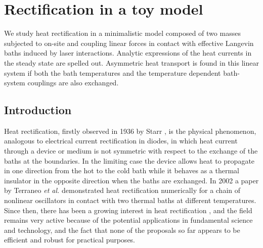 
\chapter{Rectification in a toy model}
\label{ChapterToyModel}
%
We study heat rectification in a minimalistic model composed of two masses subjected to on-site and coupling
linear forces in contact with effective Langevin baths induced by laser interactions.  Analytic expressions of the heat currents in the steady state are spelled out.  Asymmetric heat transport is found in this linear system if both the bath temperatures and the temperature dependent bath-system couplings
are also exchanged.
%
\newpage
%
\section{Introduction \label{sec:Introduction}}
%
Heat rectification, firstly observed in 1936 by Starr \cite{Starr1936}, is the physical phenomenon, analogous to electrical current rectification in diodes, in which heat current through a device or medium is not symmetric with respect to the exchange of the baths at the boundaries. In the limiting case the device allows heat to propagate in one direction from the hot to the cold bath while it behaves as a thermal insulator in the opposite direction when the baths are exchanged.  In 2002 a paper by Terraneo \textit{et al.} \cite{Terraneo2002} demonstrated heat rectification numerically for a chain of nonlinear oscillators in contact with two thermal baths at different temperatures. Since then, there has been a growing interest in heat rectification  \cite{Pereira2019,Roberts2011,Li2012,Ye2017,Wang2008,Wang2007,Casati2006,Joulain2016,Chang2006,Kobayashi2009,Leitner2013,Elzouka2017,Pons2017,Alexander2020}, and the field remains very active because of the potential applications in fundamental science and technology, and the
fact that none of the proposals so far appears to be efficient and robust for
practical purposes.

